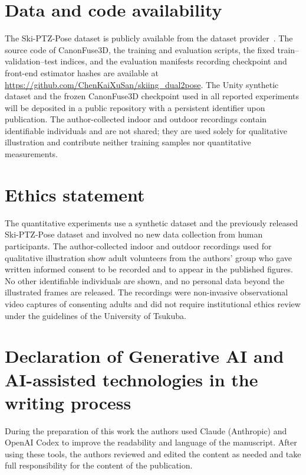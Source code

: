 \documentclass[preprint,12pt]{elsarticle}
\begin{document}
\section*{Data and code availability}
The Ski-PTZ-Pose dataset is publicly available from the dataset provider~\cite{ski_poseptz_dataset}. The source code of CanonFuse3D, the training and evaluation scripts, the fixed train--validation--test indices, and the evaluation manifests recording checkpoint and front-end estimator hashes are available at \url{https://github.com/ChenKaiXuSan/skiing_dual2pose}. The Unity synthetic dataset and the frozen CanonFuse3D checkpoint used in all reported experiments will be deposited in a public repository with a persistent identifier upon publication. The author-collected indoor and outdoor recordings contain identifiable individuals and are not shared; they are used solely for qualitative illustration and contribute neither training samples nor quantitative measurements.

\section*{Ethics statement}
The quantitative experiments use a synthetic dataset and the previously released Ski-PTZ-Pose dataset and involved no new data collection from human participants. The author-collected indoor and outdoor recordings used for qualitative illustration show adult volunteers from the authors' group who gave written informed consent to be recorded and to appear in the published figures. No other identifiable individuals are shown, and no personal data beyond the illustrated frames are released. The recordings were non-invasive observational video captures of consenting adults and did not require institutional ethics review under the guidelines of the University of Tsukuba.

\section*{Declaration of Generative AI and AI-assisted technologies in the writing process}
During the preparation of this work the authors used Claude (Anthropic) and OpenAI Codex to improve the readability and language of the manuscript. After using these tools, the authors reviewed and edited the content as needed and take full responsibility for the content of the publication.

\setlength{\bibsep}{4pt}


\end{document}
